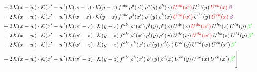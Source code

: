 \documentclass[9pt]{article}
\numberwithin{equation}{section}
\begin{document}
\begin{align}
& +2\,\mathcal{K}(x-w)\cdot \mathcal{K}(x'-w')\, \mathcal{K}(w-z)\cdot \mathcal{K}(y-z)\, f^{abc}\,\rho^{d}(x')\,\rho^{e}(y)\,\rho^{h}(x)\, {\color{red}U^{ad}(x')}\,U^{be}(y)\,{\color{red}U^{ch}(x)}\,{\color{violet} \beta}\notag\\
& -2\,\mathcal{K}(x-w)\cdot \mathcal{K}(x'-w')\, \mathcal{K}(w-z)\cdot \mathcal{K}(y-z)\, f^{abc}\,\rho^{d}(x')\,\rho^{e}(y)\,\rho^{h}(x)\, {\color{red}U^{ad}(w')}\,U^{be}(y)\,{\color{red}U^{ch}(x)}\,{\color{violet} \beta}\notag\\
&+2\,\mathcal{K}(x-w)\cdot\mathcal{K}(x'-w')\,\mathcal{K}(w'-z)\cdot\mathcal{K}(y-z)\, f^{abc}\,\rho^{c}(x')\,\rho^{l}(y)\,\rho^{e}(x)\,U^{de}(x)\,{\color{red}U^{da}(w')}\,U^{hb}(z)\,U^{hl}(y)\,{\color{green} \beta'}\notag \\ &-2\,\mathcal{K}(x-w)\cdot\mathcal{K}(x'-w')\,\mathcal{K}(w'-z)\cdot\mathcal{K}(y-z)\, f^{abc}\,\rho^{c}(x')\,\rho^{l}(y)\,\rho^{e}(x)\,U^{de}(w)\,{\color{red}U^{da}(w')}\,U^{hb}(z)\,U^{hl}(y)\,{\color{green} \beta'}\notag \\ & +2\,\mathcal{K}(x-w)\cdot\mathcal{K}(x'-w')\,\mathcal{K}(w'-z)\cdot\mathcal{K}(y-z)\, f^{abc}\,\rho^{h}(x')\,\rho^{e}(y)\,\rho^{d}(x)\,U^{be}(y)\,U^{ad}(w)\,U^{ch}(x')\,{\color{green} \beta'} \notag\\ & -2\,\mathcal{K}(x-w)\cdot\mathcal{K}(x'-w')\,\mathcal{K}(w'-z)\cdot\mathcal{K}(y-z)\, f^{abc}\,\rho^{h}(x')\,\rho^{e}(y)\,\rho^{d}(x)\,U^{be}(y)\,U^{ad}(x)\,U^{ch}(x')\,{\color{green} \beta'} \Bigg]
\end{align}
\end{document}
